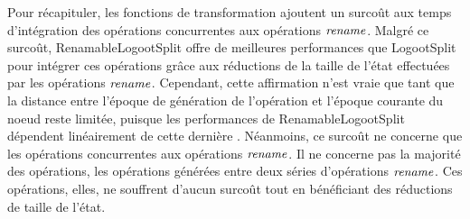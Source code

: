 Pour récapituler, les fonctions de transformation ajoutent un surcoût aux temps d'intégration des opérations concurrentes aux opérations $\mathit{rename}$.
Malgré ce surcoût, RenamableLogootSplit offre de meilleures performances que LogootSplit pour intégrer ces opérations grâce aux réductions de la taille de l'état effectuées par les opérations $\mathit{rename}$.
Cependant, cette affirmation n'est vraie que tant que la distance entre l'époque de génération de l'opération et l'époque courante du noeud reste limitée, puisque les performances de RenamableLogootSplit dépendent linéairement de cette dernière .
Néanmoins, ce surcoût ne concerne que les opérations concurrentes aux opérations $\mathit{rename}$.
Il ne concerne pas la majorité des opérations, \ie les opérations générées entre deux séries d'opérations $\mathit{rename}$.
Ces opérations, elles, ne souffrent d'aucun surcoût tout en bénéficiant des réductions de taille de l'état.
